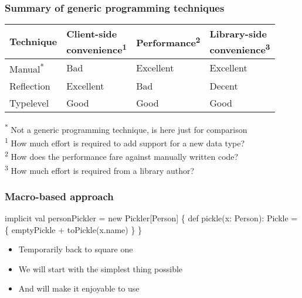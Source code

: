 \documentclass[svgnames,hyperref={bookmarks=false}]{beamer}
\begin{document}
\begin{frame}[fragile]
\frametitle{Summary of generic programming techniques}

{\tabulinesep=1.5mm
\begin{tabu}{ | p{2cm} | p{3cm} | p{2.5cm} | p{2.5cm} | }
  \hline
  Technique & \parbox{3cm}{Client-side \\ convenience\textsuperscript{1}} & Performance\textsuperscript{2} & \parbox{2.5cm}{Library-side \\ convenience\textsuperscript{3}} \\ \hline
  Manual\textsuperscript{*} & Bad & Excellent & Excellent \\ \hline
  Reflection & Excellent & Bad & Decent \\ \hline
  Typelevel & Good & Good & Good \\ \hline
\end{tabu}
}

\textsuperscript{*} Not a generic programming technique, is here just for comparison\\
\textsuperscript{1} How much effort is required to add support for a new data type?\\
\textsuperscript{2} How does the performance fare against manually written code?\\
\textsuperscript{3} How much effort is required from a library author?\\
\end{frame}

\begin{frame}[fragile]
\frametitle{}

\vskip40pt
\begin{center}
\end{center}
\end{frame}

\begin{frame}[fragile]
\frametitle{Macro-based approach}

\begin{semiverbatim}
implicit val personPickler = new Pickler[Person] \{
  def pickle(x: Person): Pickle = \{
    emptyPickle + toPickle(x.name)
  \}
\}

\end{semiverbatim}

\begin{itemize}
\item Temporarily back to square one
\item We will start with the simplest thing possible
\item And will make it enjoyable to use
\end{itemize}
\end{frame}
\end{document}
